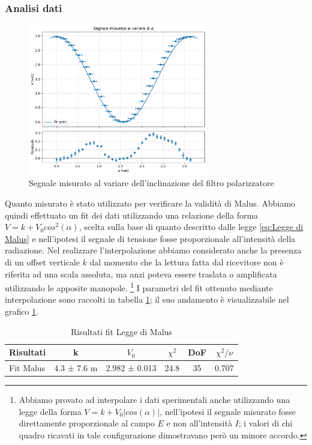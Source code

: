 \documentclass[a4paper]{article}
\begin{document}
\subsubsection{Analisi dati}
\begin{figure}[htbp]
	\centering
	\includegraphics[width=0.7\textwidth]{grafici/Malus.pdf}
	\caption{Segnale misurato al variare dell'inclinazione del filtro polarizzatore}
	\label{Malus}
\end{figure}
Quanto misurato è stato utilizzato per verificare la validità di Malus. Abbiamo quindi effettuato un fit dei dati utilizzando una relazione della forma $V = k+V_0cos^2(\alpha)$, scelta sulla base di quanto descritto dalle legge \ref{eq:Legge di Malus} e nell'ipotesi il segnale di tensione fosse proporzionale all'intensità della radiazione. Nel realizzare l'interpolazione abbiamo considerato anche la presenza di un offset verticale $k$ dal momento che la lettura fatta dal ricevitore non è riferita ad una scala assoluta, ma anzi poteva essere traslata o amplificata utilizzando le apposite manopole. \footnote{Abbiamo provato ad interpolare i dati sperimentali anche utilizzando una legge della forma $V = k + V_0|cos(\alpha)|$, nell'ipotesi il segnale misurato fosse direttamente proporzionale al campo $E$ e non all'intensità $I$; i valori di chi quadro ricavati in tale configurazione dimostravano però un minore accordo.} I parametri del fit ottenuto mediante interpolazione sono raccolti in tabella \ref{fit.Malus}; il suo andamento è visualizzabile nel grafico \ref{Malus}.
\begin{table}[htbp]
\centering
\begin{tabular}{|l|ccccc|}
\hline
Risultati & k & $V_0$ & $\chi^2$ & DoF & $\chi^2/\nu$ \\\hline\hline
Fit Malus & 4.3 ± 7.6 m & 2.982 ± 0.013 & 24.8 & 35 & 0.707 \\\hline
\end{tabular}
\caption{Risultati fit Legge di Malus}
\label{fit.Malus}
\end{table}
\end{document}

